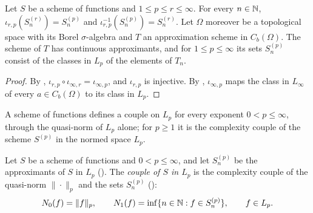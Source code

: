 \begin{lemma}
\label{lem:function-scheme-inclusion}
\leanok
{}
Let $S$ be a scheme of functions and $1 \leq p \leq r \leq \infty$. For every $n \in \mathbb{N}$,
$\iota_{r,p}(S^{(r)}_n) = S^{(p)}_n$ and $\iota_{r,p}^{-1}(S^{(p)}_n) = S^{(r)}_n$. Let
$\Omega$ moreover be a topological space with its Borel $\sigma$-algebra and $T$ an
approximation scheme in $C_b(\Omega)$. The scheme of $T$ has continuous approximants, and for
$1 \leq p \leq \infty$ its sets $S^{(p)}_n$ consist of the classes in $L_p$ of the elements of
$T_n$.
\end{lemma}

\begin{proof}
\leanok
{}
By , $\iota_{r,p} \circ \iota_{\infty,r} = \iota_{\infty,p}$, and
$\iota_{r,p}$ is injective. By , $\iota_{\infty,p}$ maps the class in
$L_\infty$ of every $a \in C_b(\Omega)$ to its class in $L_p$.
\end{proof}

A scheme of functions defines a couple on $L_p$ for every exponent $0 < p \leq \infty$, through
the quasi-norm of $L_p$ alone; for $p \geq 1$ it is the complexity couple of the scheme
$S^{(p)}$ in the normed space $L_p$.

\begin{definition}
\label{def:scheme-lp-couple}
\leanok
{}
Let $S$ be a scheme of functions and $0 < p \leq \infty$, and let $S^{(p)}_n$ be the
approximants of $S$ in $L_p$ (). The \emph{couple of $S$ in $L_p$} is
the complexity couple of the quasi-norm $\|\cdot\|_p$ and the sets $S^{(p)}_n$
():
\[
  N_0(f) = \|f\|_p , \qquad N_1(f) = \inf \{ n \in \mathbb{N} : f \in S^{(p)}_n \} , \qquad f \in L_p .
\]
\end{definition}

